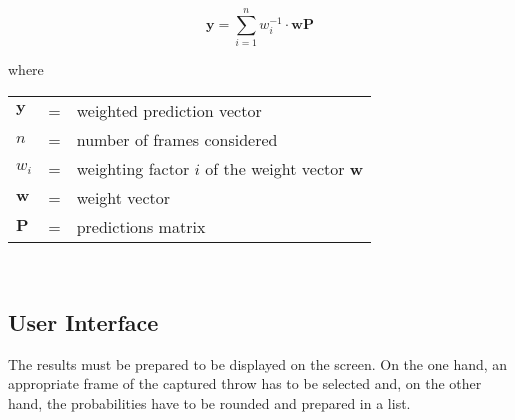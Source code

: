 \begin{equation}
  \boldsymbol{y} = \sum\limits_{i=1}^{n} w_i^{-1} \cdot \boldsymbol{w} \boldsymbol{P}
  \label{eq:weighted_prediction}
\end{equation}

where

\begin{tabular}{lll}
  $\boldsymbol{y}$ & = & weighted prediction vector \\ %
  $n$ & = & number of frames considered \\
  $w_i$ & = & weighting factor $i$ of the weight vector $\boldsymbol{w}$ \\
  $\boldsymbol{w}$ & = & weight vector \\ %
  $\boldsymbol{P}$ & = & predictions matrix \\ %
\end{tabular}
\\

\subsection{User Interface}
\label{subsec:inference:app:ui}

The results must be prepared to be displayed on the screen.
On the one hand, an appropriate frame of the captured throw has to be selected and, on the other hand, the probabilities have to be rounded and prepared in a list.

